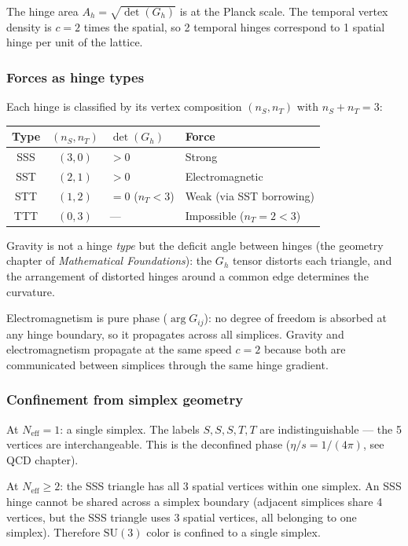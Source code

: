 The hinge area $A_h = \sqrt{\det(G_h)}$ is at the Planck scale. The temporal vertex density is $c = 2$ times the spatial, so 2 temporal hinges correspond to 1 spatial hinge per unit of the lattice.

\subsubsection{Forces as hinge types}

Each hinge is classified by its vertex composition $(n_S, n_T)$ with $n_S + n_T = 3$:

\begin{center}
\begin{tabular}{ccll}
\hline
Type & $(n_S, n_T)$ & $\det(G_h)$ & Force \\
\hline
SSS & $(3,0)$ & $> 0$ & Strong \\
SST & $(2,1)$ & $> 0$ & Electromagnetic \\
STT & $(1,2)$ & $= 0$ ($n_T < 3$) & Weak (via SST borrowing) \\
TTT & $(0,3)$ & --- & Impossible ($n_T = 2 < 3$) \\
\hline
\end{tabular}
\end{center}

Gravity is not a hinge \emph{type} but the deficit angle between hinges (the geometry chapter of \textit{Mathematical Foundations}): the $G_h$ tensor distorts each triangle, and the arrangement of distorted hinges around a common edge determines the curvature.

Electromagnetism is pure phase ($\arg G_{ij}$): no degree of freedom is absorbed at any hinge boundary, so it propagates across all simplices. Gravity and electromagnetism propagate at the same speed $c = 2$ because both are communicated between simplices through the same hinge gradient.

\subsubsection{Confinement from simplex geometry}

At $N_\text{eff} = 1$: a single simplex. The labels $S, S, S, T, T$ are indistinguishable --- the 5 vertices are interchangeable. This is the deconfined phase ($\eta/s = 1/(4\pi)$, see QCD chapter).

At $N_\text{eff} \geq 2$: the SSS triangle has all 3 spatial vertices within one simplex. An SSS hinge cannot be shared across a simplex boundary (adjacent simplices share 4 vertices, but the SSS triangle uses 3 spatial vertices, all belonging to one simplex). Therefore $\text{SU}(3)$ color is confined to a single simplex.

